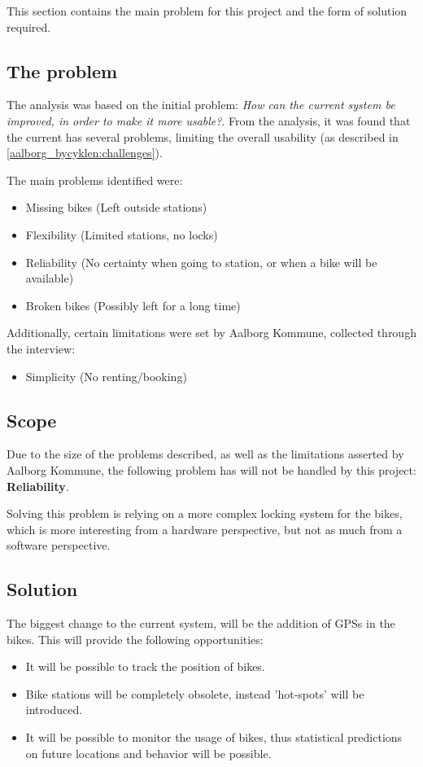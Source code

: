 This section contains the main problem for this project and the form of solution required.

\subsection{The problem}
The analysis was based on the initial problem: \textit{How can the current \citybike system be improved, in order to make it more usable?}.
From the analysis, it was found that the current \citybike has several problems, limiting the overall usability (as described in \cref{aalborg_bycyklen:challenges}).

The main problems identified were:
\begin{itemize}
\item Missing bikes (Left outside stations)
\item Flexibility (Limited stations, no locks)
\item Reliability (No certainty when going to station, or when a bike will be available)
\item Broken bikes (Possibly left for a long time)
\end{itemize}

Additionally, certain limitations were set by Aalborg Kommune, collected through the interview:

\begin{itemize}
\item Simplicity (No renting/booking)
\end{itemize}

\subsection{Scope}
Due to the size of the problems described, as well as the limitations asserted by Aalborg Kommune, the following problem has will not be handled by this project: \textbf{Reliability}.

Solving this problem is relying on a more complex locking system for the bikes, which is more interesting from a hardware perspective, but not as much from a software perspective.

\subsection{Solution}
The biggest change to the current system, will be the addition of GPSs in the bikes.
This will provide the following opportunities:
\begin{itemize}
\item It will be possible to track the position of bikes.
\item Bike stations will be completely obsolete, instead 'hot-spots' will be introduced.
\item It will be possible to monitor the usage of bikes, thus statistical predictions on future locations and behavior will be possible.
\end{itemize}

